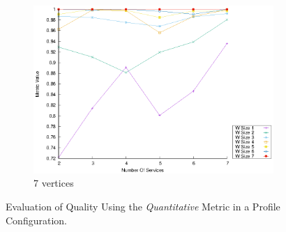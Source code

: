 \begin{figure}[!htb]
\begin{subfigure}{0.33\textwidth}
    \includegraphics[width=\textwidth]{Images/graphs/window_quality_performance_diff_perce_n7_s7_50_89_n7}
    \caption{7 vertices}
    \label{fig:quality_window_average_perce_7n}
  \end{subfigure}
  \caption{Evaluation of Quality Using the \emph{Quantitative} Metric in a \average Profile Configuration.}  \label{fig:quality_window_average_perce}
\end{figure}



